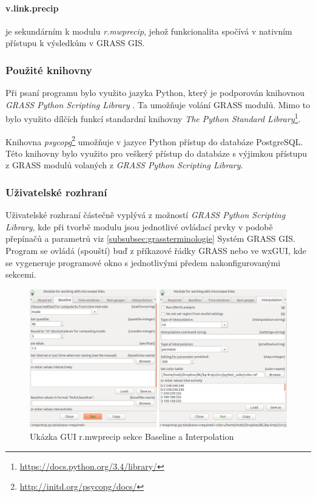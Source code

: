 \documentclass[a4paper,12pt,oneside]{report}
\begin{document}
\paragraph*{v.link.precip} je sekundárním k modulu
\textit{r.mwprecip}, jehož funkcionalita spočívá v nativním přístupu k
výsledkům v GRASS GIS.

\subsubsection{Použité knihovny}
Při psaní programu bylo využito jazyka Python, který je podporován
knihovnou \textit{GRASS Python Scripting Library} \cite{spygrass}. Ta
umožňuje volání GRASS modulů. Mimo to bylo využito dílčích funkcí standardní
knihovny \textit{The Python Standard
  Library}\footnote{\url{https://docs.python.org/3.4/library/}}.

Knihovna \textit{psycopg}\footnote{\url{http://initd.org/psycopg/docs/}}
umožňuje v jazyce Python přístup do databáze PostgreSQL. Této knihovny
bylo využito pro veškerý přístup do databáze s výjimkou přístupu z GRASS
modulů volaných z \textit{GRASS Python Scripting Library}.

\subsubsection{Uživatelské rozhraní}
Uživatelské rozhraní částečně vyplývá z možností \textit{GRASS Python
  Scripting Library}, kde při tvorbě modulu jsou jednotlivé ovládací
prvky v podobě přepínačů a
parametrů viz \ref{subsubsec:grassterminologie} Systém GRASS GIS. Program se ovládá
(spouští) buď z příkazové řádky GRASS nebo ve wxGUI, kde se vygeneruje
programové okno s jednotlivými předem nakonfigurovanými sekcemi.

\begin{figure}[h!]
    \centering
    \includegraphics[width=\textwidth]{./img/grass/gui.png}
    \caption[GUI modul]{Ukázka GUI r.mwprecip sekce Baseline a Interpolation  \centering  }
        \label{fig:baseline}
 \end{figure}
\end{document}
